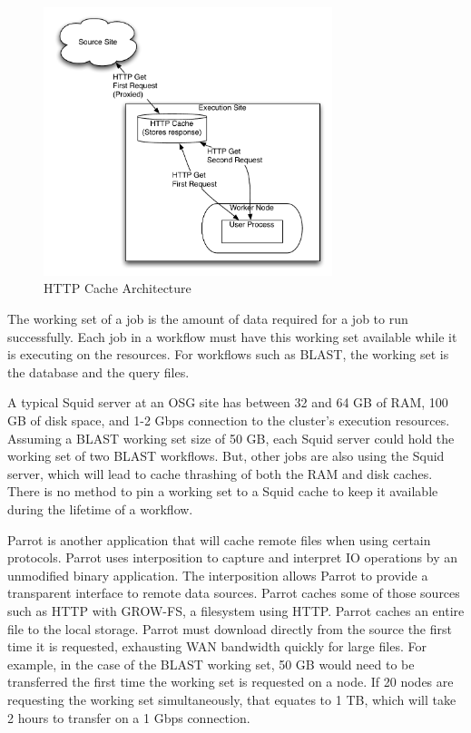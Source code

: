 \begin{figure}[ht]
	\centering
	\includegraphics[width=0.75\textwidth]{images/HTTPCache.pdf}
	\caption{HTTP Cache Architecture}
	\label{fig:httpcachearchitecture}
\end{figure}

The working set of a job is the amount of data required for a job to run successfully.  Each job in a workflow must have this working set available while it is executing on the resources.  For workflows such as BLAST, the working set is the database and the query files.  

A typical Squid server at an OSG site has between 32 and 64 GB of RAM, 100 GB of disk space, and 1-2 Gbps connection to the cluster's execution resources.  Assuming a BLAST working set size of 50 GB, each Squid server could hold the working set of two BLAST workflows.  But, other jobs are also using the Squid server, which will lead to cache thrashing of both the RAM and disk caches.  There is no method to pin a working set to a Squid cache to keep it available during the lifetime of a workflow.


Parrot \cite{thain2005parrot} is another application that will cache remote files when using certain protocols.  Parrot uses interposition \cite{thain2001multiple} to capture and interpret IO operations by an unmodified binary application.  The interposition allows Parrot to provide a transparent interface to remote data sources.  Parrot caches some of those sources such as HTTP with GROW-FS, a filesystem using HTTP.  Parrot caches an entire file to the local storage.  Parrot must download directly from the source the first time it is requested, exhausting WAN bandwidth quickly for large files.  For example, in the case of the BLAST working set, 50 GB would need to be transferred the first time the working set is requested on a node.  If 20 nodes are requesting the working set simultaneously, that equates to 1 TB, which will take 2 hours to transfer on a 1 Gbps connection.


